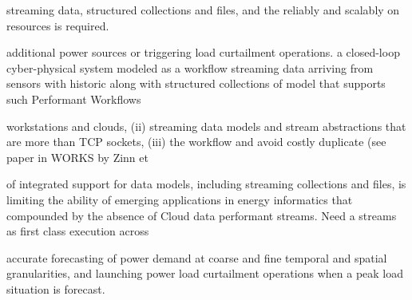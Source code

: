 \documentclass[times]{cpeauth}
\begin{document}
streaming data, structured collections and files, and the %
reliably and scalably on resources is required.

additional power sources or triggering load curtailment operations.  %
a closed-loop cyber-physical system modeled as a workflow %
streaming data arriving from sensors with historic %
along with structured collections of %
model that supports such %
Performant Workflows %


workstations and clouds, (ii) streaming data models and stream %
abstractions that are more than TCP sockets, (iii) %
the workflow and avoid costly duplicate %
(see paper in WORKS by Zinn et %


of integrated support for data models, including streaming %
collections and files, is limiting the ability of %
emerging applications in energy informatics that %
compounded by the absence of Cloud data %
performant streams.  Need a %
streams as first class %
execution across %



accurate forecasting of power demand at coarse and fine temporal and spatial %
granularities, and launching power load curtailment operations when a peak %
load situation is forecast.


\end{document}
